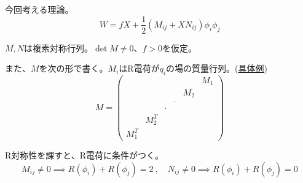 \documentclass[
  unicode,a4paper,9pt,
  xcolor = {dvipsnames,svgnames},
  hyperref ={colorlinks=true,citecolor=Navy,linkcolor=NavyBlue,urlcolor=purple},
  ja=standard,lualatex
]{beamer}
\begin{document}
\begin{frame}
  \frametitle{\subsecname}

  今回考える理論。
  \begin{equation}
    W
    =
    fX
    +
    \frac{1}{2}(M_{ij}+XN_{ij})\phi_{i}\phi_{j}
    \nonumber
  \end{equation}

  $M,N$は複素対称行列。$\det M\neq 0$、$f> 0$を仮定。

  また、$M$を次の形で書く。$M_{i}$はR電荷が$q_{i}$の場の質量行列。(\hyperref[eqn:eg]{具体例})
  \begin{equation}
    M
    =
    \begin{pmatrix}
                &           &       &       &       & M_{1} \\
                &           &       &       & M_{2} &       \\
                &           &       & \cdot &       &       \\
                &           & \cdot &       &       &       \\
                & M_{2}^{T} &       &       &       &       \\
      M_{1}^{T} &           &       &       &       &
    \end{pmatrix}
    \nonumber
  \end{equation}

  R対称性を課すと、R電荷に条件がつく。
  \begin{equation}
    M_{ij}\neq 0
    \implies
    R(\phi_{i})+R(\phi_{j})=2
    \ ,\quad
    N_{ij}\neq 0
    \implies
    R(\phi_{i})+R(\phi_{j})=0
    \nonumber
  \end{equation}

\end{frame}
\end{document}
